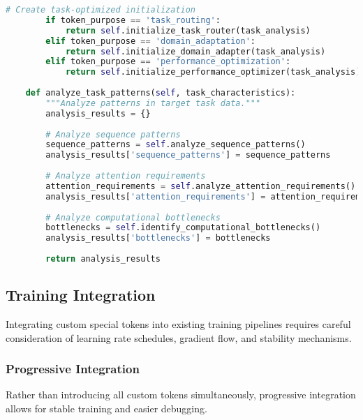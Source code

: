 \begin{lstlisting}[language=Python, caption=Advanced embedding initialization strategies]
        # Create task-optimized initialization
        if token_purpose == 'task_routing':
            return self.initialize_task_router(task_analysis)
        elif token_purpose == 'domain_adaptation':
            return self.initialize_domain_adapter(task_analysis)
        elif token_purpose == 'performance_optimization':
            return self.initialize_performance_optimizer(task_analysis)
    
    def analyze_task_patterns(self, task_characteristics):
        """Analyze patterns in target task data."""
        analysis_results = {}
        
        # Analyze sequence patterns
        sequence_patterns = self.analyze_sequence_patterns()
        analysis_results['sequence_patterns'] = sequence_patterns
        
        # Analyze attention requirements
        attention_requirements = self.analyze_attention_requirements()
        analysis_results['attention_requirements'] = attention_requirements
        
        # Analyze computational bottlenecks
        bottlenecks = self.identify_computational_bottlenecks()
        analysis_results['bottlenecks'] = bottlenecks
        
        return analysis_results
\end{lstlisting}

\subsection{Training Integration}

Integrating custom special tokens into existing training pipelines requires careful consideration of learning rate schedules, gradient flow, and stability mechanisms.

\subsubsection{Progressive Integration}

Rather than introducing all custom tokens simultaneously, progressive integration allows for stable training and easier debugging.

